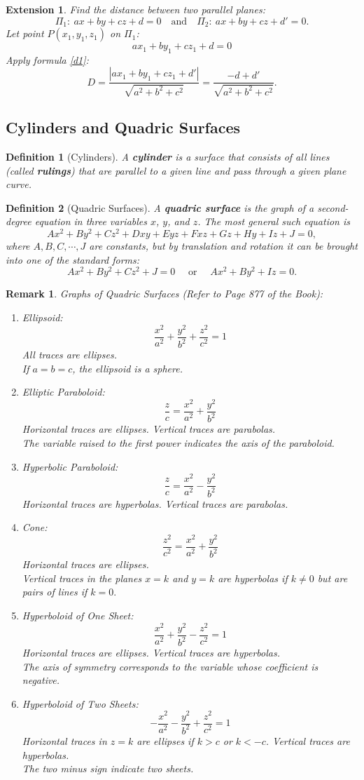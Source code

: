 \documentclass[12pt,a4paper]{article}
\newtheorem{df}{Definition}[subsection]
\newtheorem*{rmk}{\indent Remark}
\newtheorem*{ext}{\indent Extension}
\begin{document}
\begin{ext}
	Find the distance between two parallel planes: \[\Pi_1:\ ax+by+cz+d=0\quad\text{and}\quad\Pi_2:\ ax+by+cz+d'=0.\]	
	Let point $P(x_1,y_1,z_1)$ on $\Pi_1$: \[ax_1+by_1+cz_1+d=0\]
	Apply formula \ref{d1}: \[D=\frac{|ax_1+by_1+cz_1+d'|}{\sqrt{a^2+b^2+c^2}}=\frac{-d+d'}{\sqrt{a^2+b^2+c^2}}.\]
\end{ext}


\subsection{Cylinders and Quadric Surfaces}
\begin{df}[Cylinders]
	A \textbf{cylinder} is a surface that consists of all lines (called \textbf{rulings}) that are parallel to a given line and pass through a given plane curve. 	
\end{df}
\begin{df}[Quadric Surfaces]
	A \textbf{quadric surface} is the graph of a second-degree equation in three variables $x$, $y$, and $z$. The most general such equation is \[Ax^2+By^2+Cz^2+Dxy+Eyz+Fxz+Gz+Hy+Iz+J=0,\] where $A,B,C,\cdots,J$ are constants, but by translation and rotation it can be brought into one of the standard forms: \[Ax^2+By^2+Cz^2+J=0\quad\text{ or }\quad Ax^2+By^2+Iz=0.\]	
\end{df}
\begin{rmk}
	Graphs of Quadric Surfaces (Refer to Page 877 of the Book): 
	\begin{enumerate}
		\item Ellipsoid: \[\frac{x^2}{a^2}+\frac{y^2}{b^2}+\frac{z^2}{c^2}=1\] All traces are ellipses.\\ If $a=b=c$, the ellipsoid is a sphere.
		\item Elliptic Paraboloid: \[\frac{z}{c}=\frac{x^2}{a^2}+\frac{y^2}{b^2}\] Horizontal traces are ellipses. Vertical traces are parabolas.\\ The variable raised to the first power indicates the axis of the paraboloid. 
		\item Hyperbolic Paraboloid: \[\frac{z}{c}=\frac{x^2}{a^2}-\frac{y^2}{b^2}\] Horizontal traces are hyperbolas. Vertical traces are parabolas.
		\item Cone: \[\frac{z^2}{c^2}=\frac{x^2}{a^2}+\frac{y^2}{b^2}\] Horizontal traces are ellipses.\\ Vertical traces in the planes $x=k$ and $y=k$ are hyperbolas if $k\neq0$ but are pairs of lines if $k=0.$
		\item Hyperboloid of One Sheet: \[\frac{x^2}{a^2}+\frac{y^2}{b^2}-\frac{z^2}{c^2}=1\] Horizontal traces are ellipses. Vertical traces are hyperbolas.\\ The axis of symmetry corresponds to the variable whose coefficient is negative. 
		\item Hyperboloid of Two Sheets: \[-\frac{x^2}{a^2}-\frac{y^2}{b^2}+\frac{z^2}{c^2}=1\] Horizontal traces in $z=k$ are ellipses if $k>c$ or $k<-c$. Vertical traces are hyperbolas.\\ The two minus sign indicate two sheets. 
	\end{enumerate}	
\end{rmk}
\end{document}
